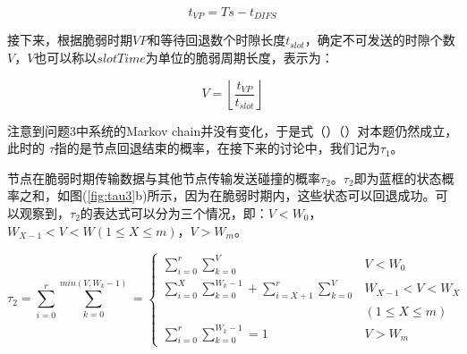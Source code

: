 \documentclass[bwprint]{gmcmthesis}
\begin{document}
\begin{equation}
t_{VP}=Ts-t_{DIFS}
    \label{eq:3.2.1}
\end{equation}

接下来，根据脆弱时期$VP$和等待回退数个时隙长度$t_{slot}$，确定不可发送的时隙个数$V$，$V$也可以称以$slotTime$为单位的脆弱周期长度，表示为：

\begin{equation}
 V=\left \lfloor \frac{t_{VP}}{t_{slot}}  \right \rfloor 
    \label{eq:3.2.2}
\end{equation}

注意到问题3中系统的Markov chain并没有变化，于是式（）（）对本题仍然成立，此时的 $\tau$指的是节点回退结束的概率，在接下来的讨论中，我们记为$\tau_1$。 

节点在脆弱时期传输数据与其他节点传输发送碰撞的概率$\tau_2$。$\tau_2$即为蓝框的状态概率之和，如图(\ref{fig:tau3}b)所示，因为在脆弱时期内，这些状态可以回退成功。可以观察到，$\tau_2$的表达式可以分为三个情况，即：$V<W_0$，$W_{X-1}<V<W (1\le X\le m)$，$V>W_m$。

\begin{equation}
\tau_2 = \sum_{i=0}^{r}\sum_{k=0}^{min(V,W_k-1)} =\left\{\begin{matrix}
\sum_{i=0}^{r}\sum_{k=0}^{V} & V<W_0\\
\sum_{i=0}^{X}\sum_{k=0}^{W_k-1}+\sum_{i=X+1}^{r}\sum_{k=0}^{V} & W_{X-1}<V<W_X & \\
&(1\le X\le m)\\
\sum_{i=0}^{r}\sum_{k=0}^{W_k-1}=1 & V>W_m
\end{matrix}\right.   
    \label{eq:3.2.31}
\end{equation}
\end{document}
